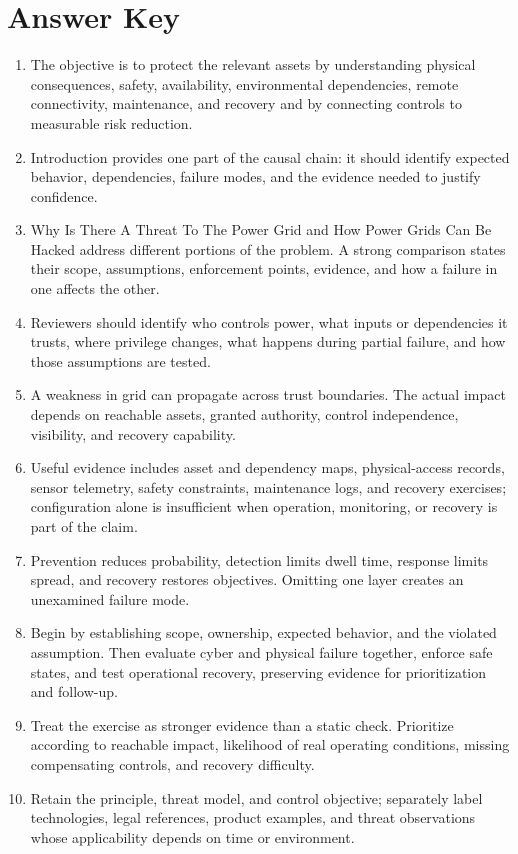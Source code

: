 \documentclass[11pt]{article}
\begin{document}
\section*{Answer Key}
\begin{enumerate}
\item The objective is to protect the relevant assets by understanding physical consequences, safety, availability, environmental dependencies, remote connectivity, maintenance, and recovery and by connecting controls to measurable risk reduction.
\item Introduction provides one part of the causal chain: it should identify expected behavior, dependencies, failure modes, and the evidence needed to justify confidence.
\item Why Is There A Threat To The Power Grid and How Power Grids Can Be Hacked address different portions of the problem. A strong comparison states their scope, assumptions, enforcement points, evidence, and how a failure in one affects the other.
\item Reviewers should identify who controls power, what inputs or dependencies it trusts, where privilege changes, what happens during partial failure, and how those assumptions are tested.
\item A weakness in grid can propagate across trust boundaries. The actual impact depends on reachable assets, granted authority, control independence, visibility, and recovery capability.
\item Useful evidence includes asset and dependency maps, physical-access records, sensor telemetry, safety constraints, maintenance logs, and recovery exercises; configuration alone is insufficient when operation, monitoring, or recovery is part of the claim.
\item Prevention reduces probability, detection limits dwell time, response limits spread, and recovery restores objectives. Omitting one layer creates an unexamined failure mode.
\item Begin by establishing scope, ownership, expected behavior, and the violated assumption. Then evaluate cyber and physical failure together, enforce safe states, and test operational recovery, preserving evidence for prioritization and follow-up.
\item Treat the exercise as stronger evidence than a static check. Prioritize according to reachable impact, likelihood of real operating conditions, missing compensating controls, and recovery difficulty.
\item Retain the principle, threat model, and control objective; separately label technologies, legal references, product examples, and threat observations whose applicability depends on time or environment.
\end{enumerate}
\end{document}

